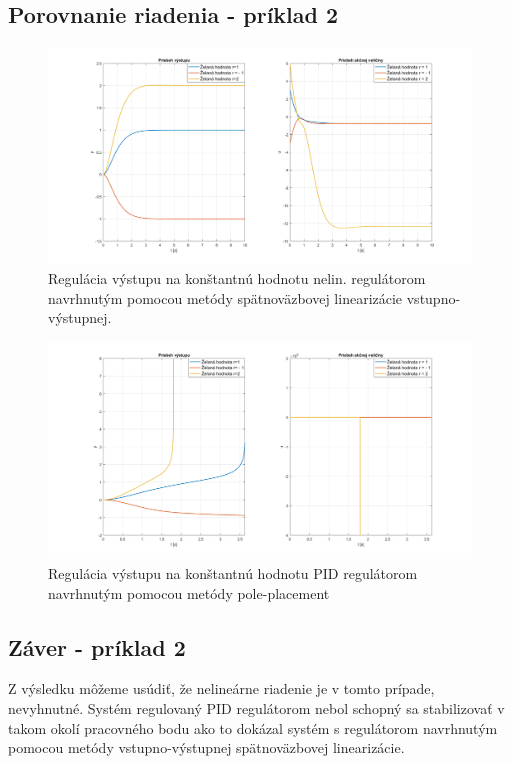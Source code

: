 \documentclass[../main.tex]{subfiles}
\begin{document}
	\subsection*{Porovnanie riadenia - príklad 2}	
	\begin{figure}[h!]
		\centering
		\includegraphics[width=\linewidth]{pr2vys}
		\caption{Regulácia výstupu na konštantnú hodnotu nelin. regulátorom navrhnutým pomocou metódy spätnoväzbovej linearizácie vstupno-výstupnej.}
		\label{fig:svlvvPr2Vys}
	\end{figure}
	\begin{figure}[h!]
		\centering
		\includegraphics[width=\linewidth]{pr2vysPID}
		\caption{Regulácia výstupu na konštantnú hodnotu PID regulátorom navrhnutým pomocou metódy pole-placement}
		\label{fig:svlvvPr2VysPID}
	\end{figure}
	\newpage
	\subsection*{Záver - príklad 2}
	Z výsledku môžeme usúdiť, že nelineárne riadenie je v tomto prípade, nevyhnutné. Systém regulovaný PID regulátorom nebol schopný sa stabilizovať v takom okolí pracovného bodu ako to dokázal systém s regulátorom navrhnutým pomocou metódy vstupno-výstupnej spätnoväzbovej linearizácie. 


	
\end{document}
